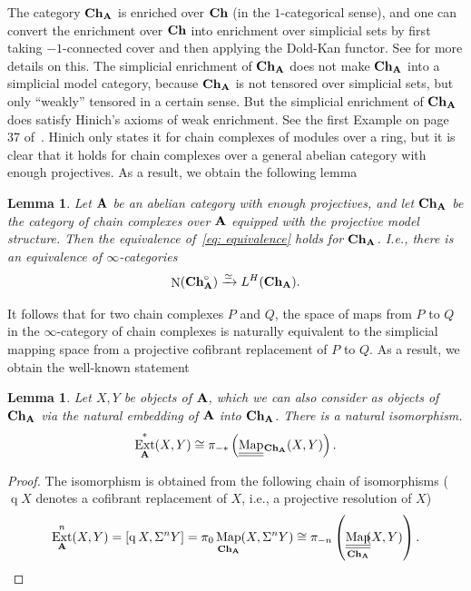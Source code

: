 \documentclass[psamsfonts]{amsart}
\theoremstyle{plain}
\newtheorem{lem}[thm]{Lemma}
\theoremstyle{definition}
\theoremstyle{remark}
\newcommand{\catname}[1]{{\normalfont\textbf{#1}}}
\newcommand{\ch}{\catname{Ch}}
\newcommand{\DK}{L^H}
\newcommand{\cofibrant}[1]{\operatorname{q}#1}
\DeclareMathOperator{\ext}{Ext}
\DeclareMathOperator{\map}{Map}
\DeclareMathOperator{\spectralmaps}{\underline{\underline{\map}}}
\DeclareMathOperator{\Nerve}{N}
\begin{document}
The category $\ch_{\catname{A}}$ is enriched over $\ch$ (in the $1$-categorical sense), and one can convert the enrichment over $\ch$ into enrichment over simplicial sets by first taking $-1$-connected cover and then applying the Dold-Kan functor. See \cite[Page 79]{LurieHA} for more details on this. The simplicial enrichment of $\ch_{\catname{A}}$  does not make $\ch_{\catname{A}}$ into a simplicial model category, because $\ch_{\catname{A}}$ is not tensored over simplicial sets, but only ``weakly'' tensored in a certain sense. But the simplicial enrichment of $\ch_{\catname{A}}$ does satisfy Hinich's axioms of weak enrichment. See the first Example on page 37 of~\cite{HinichDK}. Hinich only states it for chain complexes of modules over a ring, but it is clear that it holds for chain complexes over a general abelian category with enough projectives. As a result, we obtain the following lemma
\begin{lem}\label{lem:DK for ch}
Let $\catname{A}$ be an abelian category with enough projectives, and let $\ch_{\catname{A}}$ be the category of chain complexes over $\catname{A}$ equipped with the projective model structure. Then the equivalence of~\eqref{eq: equivalence} holds for $\ch_{\catname{A}}$. I.e., there is an equivalence of $\infty$-categories
\[
\Nerve(\ch_{\catname{A}}^\circ)\xrightarrow{\simeq} \DK(\ch_{\catname{A}}).
\]
\end{lem}
It follows that for two chain complexes $P$ and $Q$, the space of maps from $P$ to $Q$ in the $\infty$-category of chain complexes is naturally equivalent to the simplicial mapping space from a projective cofibrant replacement of $P$ to $Q$. As a result, we obtain the well-known statement 
\begin{lem}\label{lem:ext-pi}
Let $X, Y$ be objects of $\catname{A}$, which we can also consider as objects of $\ch_{\catname{A}}$ via the natural embedding of $\catname{A}$ into $\ch_{\catname{A}}$. There is a natural isomorphism. 
\begin{equation}\label{eq: ext-pi}
\ext^*_{\catname{A}}(X, Y)\cong \pi_{-*}\left(\spectralmaps \hphantom{.}_{\!\!\!\ch_{\catname{A}}}(X, Y)\right).
\end{equation}
\end{lem}
\begin{proof}
The isomorphism is obtained from the following chain of isomorphisms ($\cofibrant{X}$ denotes a cofibrant replacement of $X$, i.e., a projective resolution of $X$)
\[
\ext^n_{\catname{A}}(X, Y)=[\cofibrant{X}, \Sigma^nY]=\pi_0\map_{\ch_{\catname{A}}}(X, \Sigma^nY)\cong \pi_{-n}\left(\spectralmaps_{\ch_{\catname{A}}}\!\!(X, Y)\right).
\]
\end{proof}
\end{document}
